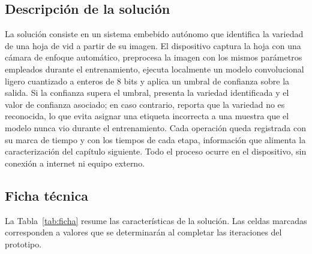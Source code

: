 \subsection{Descripción de la solución}

La solución consiste en un sistema embebido autónomo que identifica la
variedad de una hoja de vid a partir de su imagen. El dispositivo captura la
hoja con una cámara de enfoque automático, preprocesa la imagen con los
mismos parámetros empleados durante el entrenamiento, ejecuta localmente un
modelo convolucional ligero cuantizado a enteros de 8 bits y aplica un umbral
de confianza sobre la salida. Si la confianza supera el umbral, presenta la
variedad identificada y el valor de confianza asociado; en caso contrario,
reporta que la variedad no es reconocida, lo que evita asignar una etiqueta
incorrecta a una muestra que el modelo nunca vio durante el entrenamiento.
Cada operación queda registrada con su marca de tiempo y con los tiempos de
cada etapa, información que alimenta la caracterización del capítulo
siguiente. Todo el proceso ocurre en el dispositivo, sin conexión a internet
ni equipo externo.

\subsection{Ficha técnica}

La Tabla~\ref{tab:ficha} resume las características de la solución. Las
celdas marcadas corresponden a valores que se determinarán al completar las
iteraciones del prototipo.

